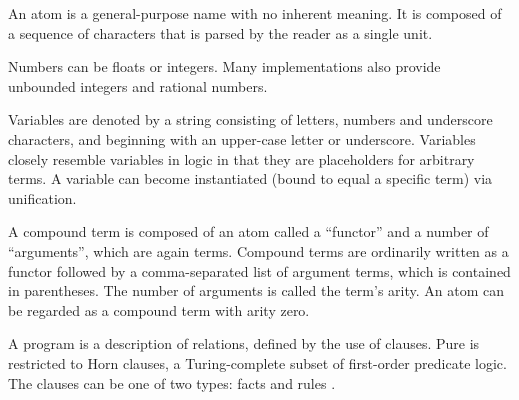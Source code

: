 \documentclass[thesis-solanki.tex]{subfiles}
\begin{document}
An atom is a general-purpose name with no inherent meaning. It is composed of a sequence of characters that is parsed by the 
 reader as a single unit.

Numbers can be floats or integers. Many  implementations also provide unbounded integers and rational numbers.

Variables are denoted by a string consisting of letters, numbers and underscore characters, and beginning with an upper-case letter or 
underscore. Variables closely resemble variables in logic in that they are placeholders for arbitrary terms. A variable can become 
instantiated (bound to equal a specific term) via unification.

A compound term is composed of an atom called a ``functor'' and a number of ``arguments'', which are again terms. Compound terms are 
ordinarily written as a functor followed by a comma-separated list of argument terms, which is contained in parentheses. The number of 
arguments is called the term's arity. An atom can be regarded as a compound term with arity zero.


A  program is a description of relations, defined by the use of clauses. Pure  is restricted to Horn 
clauses, a Turing-complete subset of first-order predicate logic. The clauses can be one of two types: facts and rules 
\cite{website:prologintroumiami}.

\end{document}
